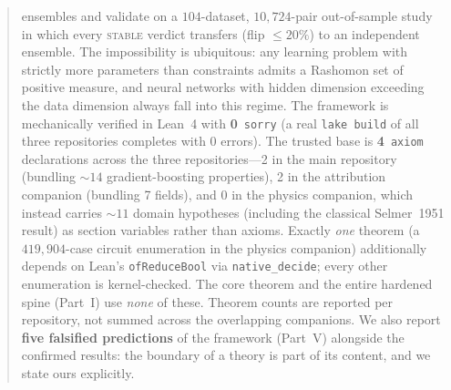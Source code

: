 \documentclass[11pt,a4paper]{article}
\begin{document}
\begin{abstract}
ensembles and validate on a $104$-dataset, $10{,}724$-pair out-of-sample study in which every
\textsc{stable} verdict transfers (flip $\leq 20\%$) to an independent ensemble.
The impossibility is ubiquitous: any learning problem with strictly more
parameters than constraints admits a Rashomon set of positive measure, and
neural networks with hidden dimension exceeding the data dimension always fall
into this regime.
The framework is mechanically verified in Lean~4 with \textbf{0}~\texttt{sorry}
(a real \texttt{lake build} of all three repositories completes with 0 errors).
The trusted base is \textbf{4}~\texttt{axiom} declarations across the three
repositories---2 in the main repository (bundling ${\sim}14$ gradient-boosting
properties), 2 in the attribution companion (bundling 7 fields), and 0 in the physics
companion, which instead carries ${\sim}11$ domain hypotheses (including the classical
Selmer~1951 result) as section variables rather than axioms. Exactly \emph{one}
theorem (a $419{,}904$-case circuit enumeration in the physics companion) additionally
depends on Lean's \texttt{ofReduceBool} via \texttt{native\_decide}; every other
enumeration is kernel-checked. The core theorem and the entire hardened spine (Part~I) use
\emph{none} of these. Theorem counts are reported per repository, not summed across the
overlapping companions.
We also report \textbf{five falsified predictions} of the framework
(Part~V) alongside the confirmed results: the boundary of a theory is part
of its content, and we state ours explicitly.
\end{abstract}

\newpage
\tableofcontents
\newpage


\clearpage
\end{document}
